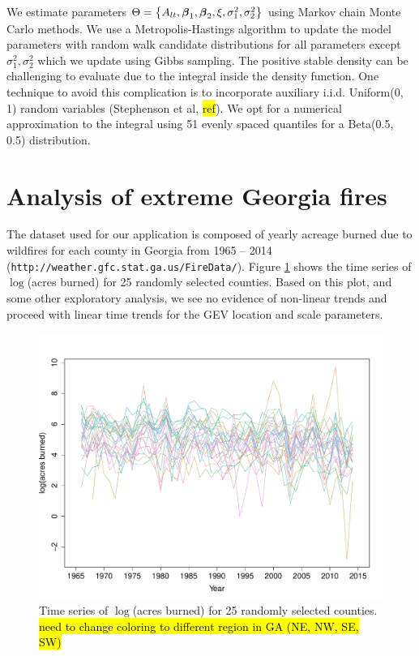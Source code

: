 \documentclass[11pt]{article}
\begin{document}
We estimate parameters $\Theta = \left\{A_{lt}, \mbox{\boldmath $\beta$}_1, \mbox{\boldmath $\beta$}_2, \xi, \sigma^2_1, \sigma^2_2 \right\}$ using Markov chain Monte Carlo methods.
We use a Metropolis-Hastings algorithm to update the model parameters with random walk candidate distributions for all parameters except $\sigma^2_1, \sigma^2_2$ which we update using Gibbs sampling.
The positive stable density can be challenging to evaluate due to the integral inside the density function.
One technique to avoid this complication is to incorporate auxiliary i.i.d. Uniform(0, 1) random variables (Stephenson et al, \hl{ref}).
We opt for a numerical approximation to the integral using 51 evenly spaced quantiles for a Beta(0.5, 0.5) distribution.

\section{Analysis of extreme Georgia fires}\label{s:analysis}
The dataset used for our application is composed of yearly acreage burned due to wildfires for each county in Georgia from 1965 -- 2014 (\texttt{http://weather.gfc.stat.ga.us/FireData/}).
Figure \ref{fig:firets25} shows the time series of $\log$(acres burned) for 25 randomly selected counties.
Based on this plot, and some other exploratory analysis, we see no evidence of non-linear trends and proceed with linear time trends for the GEV location and scale parameters.

\begin{figure}[htbp]
  \centering
  \includegraphics[width=0.80\linewidth]{plots/spag-rand-25}
  \caption{Time series of $\log$(acres burned) for 25 randomly selected counties. \hl{need to change coloring to different region in GA (NE, NW, SE, SW)}}
  \label{fig:firets25}
\end{figure}
\end{document}
